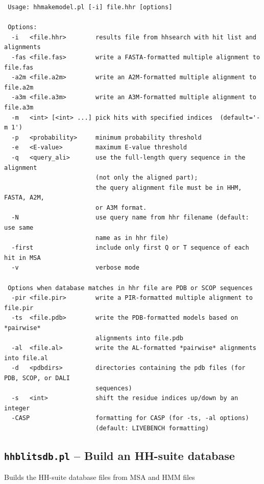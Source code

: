 \documentclass[11pt,a4paper]{article}
\begin{document}
\small 
\begin{verbatim}
 Usage: hhmakemodel.pl [-i] file.hhr [options]

 Options:
  -i   <file.hhr>        results file from hhsearch with hit list and alignments
  -fas <file.fas>        write a FASTA-formatted multiple alignment to file.fas
  -a2m <file.a2m>        write an A2M-formatted multiple alignment to file.a2m
  -a3m <file.a3m>        write an A3M-formatted multiple alignment to file.a3m
  -m   <int> [<int> ...] pick hits with specified indices  (default='-m 1')
  -p   <probability>     minimum probability threshold     
  -e   <E-value>         maximum E-value threshold      
  -q   <query_ali>       use the full-length query sequence in the alignment 
                         (not only the aligned part);
                         the query alignment file must be in HHM, FASTA, A2M,  
                         or A3M format.
  -N                     use query name from hhr filename (default: use same  
                         name as in hhr file)
  -first                 include only first Q or T sequence of each hit in MSA
  -v                     verbose mode

 Options when database matches in hhr file are PDB or SCOP sequences
  -pir <file.pir>        write a PIR-formatted multiple alignment to file.pir 
  -ts  <file.pdb>        write the PDB-formatted models based on *pairwise*  
                         alignments into file.pdb
  -al  <file.al>         write the AL-formatted *pairwise* alignments into file.al
  -d   <pdbdirs>         directories containing the pdb files (for PDB, SCOP, or DALI  
                         sequences)
  -s   <int>             shift the residue indices up/down by an integer           
  -CASP                  formatting for CASP (for -ts, -al options) 
                         (default: LIVEBENCH formatting)
\end{verbatim} 
\normalsize


\subsection{{\tt hhblitsdb.pl} -- Build an HH-suite database }

Builds the HH-suite database files from MSA and HMM files 
\end{document}
